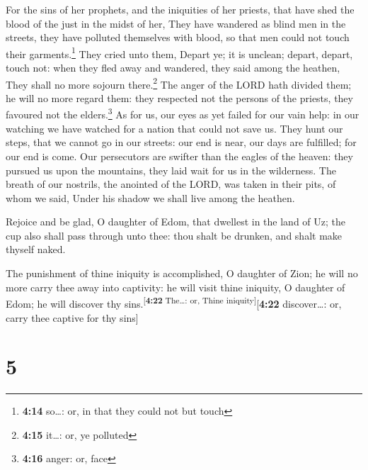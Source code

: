  For the sins of her prophets, and the iniquities of her
priests, that have shed the blood of the just in the midst of her,
 They have wandered as blind men in the streets, they
have polluted themselves with blood, so that men could not touch their
garments.\footnote{\textbf{4:14} so\ldots: or, in that they could not
  but touch}  They cried unto them, Depart ye; it is
unclean; depart, depart, touch not: when they fled away and wandered,
they said among the heathen, They shall no more sojourn
there.\footnote{\textbf{4:15} it\ldots: or, ye polluted} 
The anger of the LORD hath divided them; he will no more regard them:
they respected not the persons of the priests, they favoured not the
elders.\footnote{\textbf{4:16} anger: or, face}  As for
us, our eyes as yet failed for our vain help: in our watching we have
watched for a nation that could not save us.  They hunt
our steps, that we cannot go in our streets: our end is near, our days
are fulfilled; for our end is come.  Our persecutors are
swifter than the eagles of the heaven: they pursued us upon the
mountains, they laid wait for us in the wilderness.  The
breath of our nostrils, the anointed of the LORD, was taken in their
pits, of whom we said, Under his shadow we shall live among the heathen.

 Rejoice and be glad, O daughter of Edom, that dwellest
in the land of Uz; the cup also shall pass through unto thee: thou shalt
be drunken, and shalt make thyself naked.

 The punishment of thine iniquity is accomplished, O
daughter of Zion; he will no more carry thee away into captivity: he
will visit thine iniquity, O daughter of Edom; he will discover thy
sins.\textsuperscript{{[}\textbf{4:22} The\ldots: or, Thine
iniquity{]}}{[}\textbf{4:22} discover\ldots: or, carry thee captive for
thy sins{]}

\hypertarget{section-4}{%
\section{5}\label{section-4}}

